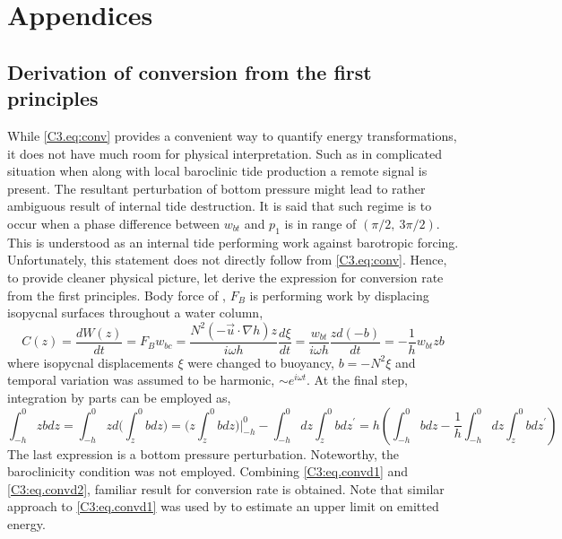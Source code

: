 \documentclass[12pt]{article}
\begin{document}
\section*{Appendices}

\renewcommand{\thesubsection}{\Alph{subsection}}
\setcounter{subsection}{0}
\subsection{Derivation of conversion from the first principles}
\label{C3.app:conv}
While \eqref{C3.eq:conv} provides a convenient way to quantify energy transformations, it does 
not have much room for physical interpretation. Such as in complicated situation when along with 
local baroclinic tide production a remote signal is present. The resultant perturbation of bottom 
pressure might lead to rather ambiguous result of internal tide destruction. It is said that such 
regime is to occur when a phase difference between $w_{bt}$ and $p_{1}$ is in range of 
$(\pi/2,~3\pi/2)$. This is understood as an internal tide performing work against barotropic 
forcing. Unfortunately, this statement does not directly follow from \eqref{C3.eq:conv}. Hence, to 
provide cleaner physical picture, let derive the expression for conversion rate from the first 
principles. Body force of \citep{baines1982internal}, $F_B$ is performing work by displacing 
isopycnal 
surfaces throughout a water column,
\begin{equation}
\label{C3:eq.convd1}
C(z) = \frac{dW(z)}{dt} = F_{B} w_{bc} = \frac{N^2 (-\vec{u} \cdot \nabla h) z}{i \omega h} 
\frac{d 
	\xi}{dt} = \frac{w_{bt}}{i \omega h} \frac{z d(-b)}{dt} = -\frac{1}{h} w_{bt} zb
\end{equation}
where isopycnal displacements $\xi$ were changed to buoyancy, $b = -N^2 \xi$ and temporal 
variation 
was assumed to be harmonic, $\sim e^{i \omega t}$. At the final step, integration by parts can be 
employed as,
\begin{equation}
\label{C3:eq.convd2}
\int_{-h}^{0} z b dz = \int_{-h}^{0} z d \big( \int^0_{z} b dz \big) = \big( z \int^0_{z} b dz 
\big)\big|_{-h}^0 - \int_{-h}^{0} dz \int_{z}^{0} b dz^{\prime} = h (\int_{-h}^{0}b dz - 
\frac{1}{h} \int_{-h}^{0} dz \int_{z}^{0} b dz^{\prime})
\end{equation}
The last expression is a bottom pressure perturbation. Noteworthy, the baroclinicity condition was 
not employed. Combining \eqref{C3:eq.convd1} and \eqref{C3:eq.convd2}, familiar result 
for conversion rate is obtained. Note that similar approach to \eqref{C3:eq.convd1} was used 
by \citep{nash2006structure} to estimate an upper limit on emitted energy.\\
\end{document}
